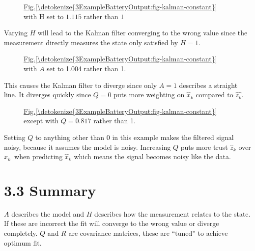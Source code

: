 \documentclass[letterpaper,10pt,english]{jupyterBook}
\begin{document}
\begin{figure}[htbp]
\centering
\capstart

\noindent{}
\caption{\hyperref[\detokenize{3ExampleBatteryOutput:fig-kalman-constant}]{Fig.\@ \ref{\detokenize{3ExampleBatteryOutput:fig-kalman-constant}}} with H set to \(1.115\) rather than \(1\)}\label{\detokenize{3ExampleBatteryOutput:figu-kalman-wrong-h}}\end{figure}

\sphinxAtStartPar
Varying \(H\) will lead to the Kalman filter converging to the wrong value since the measurement directly measures the state only satisfied by \(H = 1\).

\begin{figure}[htbp]
\centering
\capstart

\noindent{}
\caption{\hyperref[\detokenize{3ExampleBatteryOutput:fig-kalman-constant}]{Fig.\@ \ref{\detokenize{3ExampleBatteryOutput:fig-kalman-constant}}} with \(A\) set to 1.004 rather than 1.}\label{\detokenize{3ExampleBatteryOutput:fig-kalman-a-1004}}\end{figure}

\sphinxAtStartPar
This causes the Kalman filter to diverge since only \(A=1\) describes a straight line. It diverges quickly since \(Q=0\) puts more weighting on \(\hat{x}_k\) compared to \(\hat{z_k}\).

\begin{figure}[htbp]
\centering
\capstart

\noindent{}
\caption{\hyperref[\detokenize{3ExampleBatteryOutput:fig-kalman-constant}]{Fig.\@ \ref{\detokenize{3ExampleBatteryOutput:fig-kalman-constant}}} except with \(Q = 0.817\) rather than 1.}\label{\detokenize{3ExampleBatteryOutput:fig-kalman-q-0817}}\end{figure}

\sphinxAtStartPar
Setting \(Q\) to anything other than \(0\) in this example makes the filtered signal noisy, because it assumes the model is noisy. Increasing \(Q\) puts more trust \(\hat{z}_k\) over \(\hat{x}^-_{k}\) when predicting \(\hat{x}_k\) which means the signal becomes noisy like the data.


\section{3.3 Summary}
\label{\detokenize{3ExampleBatteryOutput:summary}}
\sphinxAtStartPar
\(A\) describes the model and \(H\) describes how the measurement relates to the state. If these are incorrect the fit will converge to the wrong value or diverge completely. \(Q\) and \(R\) are covariance matrices, these are “tuned” to achieve optimum fit.
\end{document}

